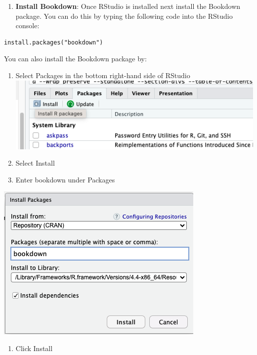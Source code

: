 \documentclass[
]{book}
\providecommand{\tightlist}{%
  \setlength{\itemsep}{0pt}\setlength{\parskip}{0pt}}
\theoremstyle{definition}
\theoremstyle{definition}
\theoremstyle{definition}
\theoremstyle{definition}
\theoremstyle{remark}
\begin{document}
\begin{enumerate}
\def\labelenumi{\arabic{enumi}.}
\setcounter{enumi}{2}
\tightlist
\item
  \textbf{Install Bookdown}:
  Once RStudio is installed next install the Bookdown package. You can do this by typing the following code into the RStudio console:
\end{enumerate}

\begin{verbatim}
install.packages("bookdown")
\end{verbatim}

You can also install the Bookdown package by:

\begin{enumerate}
\def\labelenumi{\roman{enumi}.}
\item
  Select Packages in the bottom right-hand side of RStudio
  \includegraphics{images/tutorialscreenshots/installPackage.png}
\item
  Select Install
\item
  Enter bookdown under Packages
\end{enumerate}

\includegraphics{images/tutorialscreenshots/installBookdownPack.png}

\begin{enumerate}
\def\labelenumi{\roman{enumi}.}
\setcounter{enumi}{3}
\tightlist
\item
  Click Install
\end{enumerate}
\end{document}
